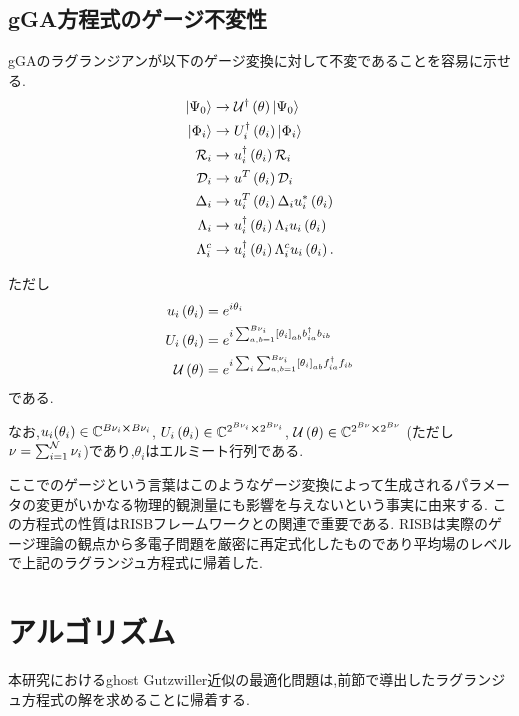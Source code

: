 \subsection{gGA方程式のゲージ不変性}
gGAのラグランジアンが以下のゲージ変換に対して不変であることを容易に示せる.
\begin{align}
    \Ket{\Psi_{0}}&\rightarrow \mathcal{U}^\dagger \left( \theta \right)\Ket{\Psi_{0}}\\
    \Ket{\Phi_{i}}&\rightarrow U^\dagger_{i}\left( \theta_{i} \right)\Ket{\Phi_{i}}\\
    \mathcal{R}_{i}&\rightarrow u^\dagger_{i}\left( \theta_{i} \right)\mathcal{R}_{i}\\
    \mathcal{D}_{i}&\rightarrow u^{T}\left( \theta_{i} \right)\mathcal{D}_{i}\\
    \Delta_{i}&\rightarrow u^{T}_{i}\left( \theta_{i} \right)\Delta_{i}u^*_{i}\left( \theta_{i} \right)\\
    \Lambda_{i}&\rightarrow u^\dagger_{i}\left( \theta_{i} \right)\Lambda_{i}u_{i}\left( \theta_{i} \right)\\
    \Lambda^{c}_{i}&\rightarrow u^\dagger_{i}\left( \theta_{i} \right)\Lambda^{c}_{i}u_{i}\left( \theta_{i} \right).
\end{align}

ただし
\begin{align}
    u_{i}\left( \theta_{i} \right)&=e^{i\theta_{i}}\\
    U_{i}\left( \theta_{i} \right)&=e^{i\sum_{a,b=1}^{B\nu_{i}}\left[ \theta_{i} \right]_{ab}b^\dagger_{ia}b_{ib}}\\
    \mathcal{U}\left( \theta \right)&=e^{i\sum_{i}\sum_{a,b=1}^{B\nu_{i}}\left[ \theta_{i} \right]_{ab}f^\dagger_{ia}f_{ib}}
\end{align}
である.

なお,$u_{i}(\theta_{i})\in \mathbb{C}^{B\nu_{i}\cross B\nu_{i}}$, $U_{i}\left( \theta_{i} \right)\in \mathbb{C}^{2^{B\nu_{i}}\cross 2^{B\nu_{i}}}$, $\mathcal{U}\left( \theta \right)\in \mathbb{C}^{2^{B\nu}\cross 2^{B\nu}}$ (ただし$\nu=\sum_{i=1}^{\mathcal{N}}\nu_{i}$)であり,$\theta_{i}$はエルミート行列である.

ここでのゲージという言葉はこのようなゲージ変換によって生成されるパラメータの変更がいかなる物理的観測量にも影響を与えないという事実に由来する.
この方程式の性質はRISBフレームワークとの関連で重要である.
RISBは実際のゲージ理論の観点から多電子問題を厳密に再定式化したものであり平均場のレベルで上記のラグランジュ方程式に帰着した.

\section{アルゴリズム}

本研究におけるghost Gutzwiller近似の最適化問題は,前節で導出したラグランジュ方程式の解を求めることに帰着する.

